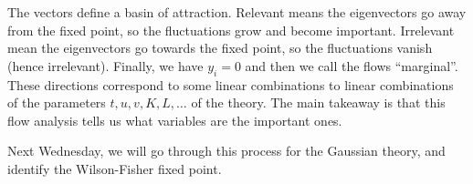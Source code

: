 The vectors define a basin of attraction. Relevant means the eigenvectors go away from the fixed point, so the fluctuations grow and become important. Irrelevant mean the eigenvectors go towards the fixed point, so the fluctuations vanish (hence irrelevant). Finally, we have $y_i = 0$ and then we call the flows ``marginal''. These directions correspond to some linear combinations to linear combinations of the parameters $t, u, v, K, L,\ldots$ of the theory. The main takeaway is that this flow analysis tells us what variables are the important ones.

Next Wednesday, we will go through this process for the Gaussian theory, and identify the Wilson-Fisher fixed point.